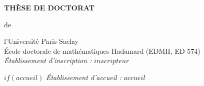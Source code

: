 \documentclass[12pt,twoside]{reedthesis}
\begin{document}
\begin{center}
{\Large\bf THÈSE DE DOCTORAT}
\end{center}
\begin{center}
{de }
\end{center}
\begin{center}
 {\Large\sc l'Université Paris-Saclay}\\
  \vspace*{0.4cm}
École doctorale de mathématiques Hadamard (EDMH, ED 574)\\
 \vspace*{0.4cm}
{\small \it Établissement d'inscription : }
$inscripteur$

 \vspace*{0.2cm}
$if(accueil)$
{\small \it \'Etablissement d'accueil : }
$accueil$


\end{center}
\end{document}
